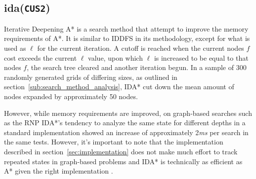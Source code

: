 \subsection{\texorpdfstring{\acrfull{ida}(\texttt{CUS2})}{IDA}} %
\label{sub:texorpdfstring}
Iterative Deepening A* is a search method that attempt to improve the memory requirements of A*. It is similar to IDDFS in its methodology, except for what is used as $\ell$ for the current iteration. A cutoff is reached when the current nodes $f$ cost exceeds the current $\ell$ value, upon which $\ell$ is increased to be equal to that nodes $f$, the search tree cleared and another iteration begun. In a sample of 300 randomly generated grids of differing sizes, as outlined in section~\ref{sub:search_method_analysis}, IDA* cut down the mean amount of nodes expanded by approximately 50 nodes.\par
However, while memory requirements are improved, on graph-based searches such as the RNP IDA*'s tendency to analyze the same state for different depths in a standard implementation showed an increase of approximately 2\textit{ms} per search in the same tests. However, it's important to note that the implementation described in section~\ref{sec:implementation} does not make much effort to track repeated states in graph-based problems and IDA* is technically as efficient as A* given the right implementation \parencite{idas}.


